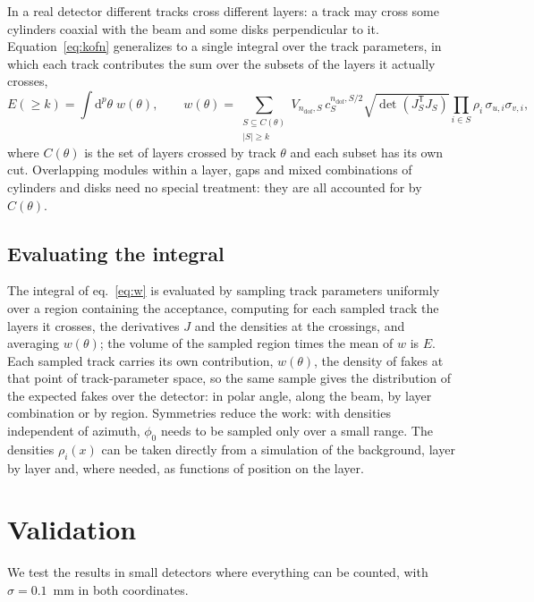 \IfFileExists{jinst.cls}{\documentclass[a4paper,11pt]{jinst}}
\newcommand{\ndof}{n_\mathrm{dof}}
\newcommand{\dd}{\mathrm{d}}
\begin{document}
In a real detector different tracks cross different layers: a track may cross some
cylinders coaxial with the beam and some disks perpendicular to it. Equation~\eqref{eq:kofn}
generalizes to a single integral over the track parameters, in which each track contributes the
sum over the subsets of the layers it actually crosses,
\begin{equation}
  E(\ge k) = \int\dd^p\theta\;w(\theta),\qquad
  w(\theta)=\sum_{\substack{S\subseteq C(\theta)\\|S|\ge k}} V_{\ndof,S}\,c_S^{\ndof,S/2}
  \sqrt{\det\!\left(J_S^\mathsf{T}J_S\right)}\prod_{i\in S}\rho_i\,\sigma_{u,i}\sigma_{v,i},
  \label{eq:w}
\end{equation}
where $C(\theta)$ is the set of layers crossed by track $\theta$ and each subset has its own
cut. Overlapping modules within a layer, gaps and mixed combinations of cylinders and disks need no
special treatment: they are all accounted for by $C(\theta)$.

\subsection{Evaluating the integral}\label{sec:sampling}

The integral of eq.~\eqref{eq:w} is evaluated by sampling track parameters uniformly over a
region containing the acceptance, computing for each sampled track the layers it crosses, the
derivatives $J$ and the densities at the crossings, and averaging $w(\theta)$; the volume of the
sampled region times the mean of $w$ is $E$. Each sampled track carries its own contribution,
$w(\theta)$, the density of fakes at that point of track-parameter space, so the same sample
gives the distribution of the expected fakes over the detector: in polar angle, along the beam,
by layer combination or by region. Symmetries reduce the work: with densities independent of
azimuth, $\phi_0$ needs to be sampled only over a small range. The densities $\rho_i(x)$ can be
taken directly from a simulation of the background, layer by layer and, where needed, as
functions of position on the layer.

\section{Validation}\label{sec:validation}

We test the results in small detectors where everything can be counted, with $\sigma=0.1$~mm in
both coordinates.
\end{document}
